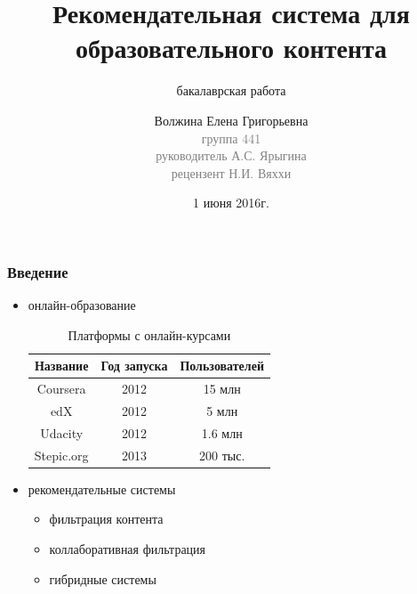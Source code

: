 \documentclass{beamer}
\begin{document}
\large
\title{Рекомендательная система для образовательного контента}
\subtitle{бакалаврская работа}
\author{Волжина Елена Григорьевна\\{\footnotesize\textcolor{gray}{группа 441\\руководитель А.С. Ярыгина\\рецензент Н.И. Вяххи}}}
\date{1 июня 2016г.}
\frame{\titlepage}

\begin{frame}\frametitle{Введение}
\begin{itemize}
\item онлайн-образование
    \begin{table}[t]
        \normalsize
        \centering
        \begin{tabular}{c|c|c}
        \hline
        Название & Год запуска & Пользователей \\
        \hline
        \hline
        Coursera & 2012 & 15 млн \\
        edX & 2012 & 5 млн \\
        Udacity & 2012 & 1.6 млн \\
        Stepic.org & 2013 & 200 тыс. \\
        \hline
        \end{tabular}
        \caption{Платформы с онлайн-курсами}
    \end{table}

\bigskip
\item рекомендательные системы
    \begin{itemize}
        \item фильтрация контента
        \item коллаборативная фильтрация
        \item гибридные системы
    \end{itemize}
\end{itemize}
\end{frame}
\end{document}
